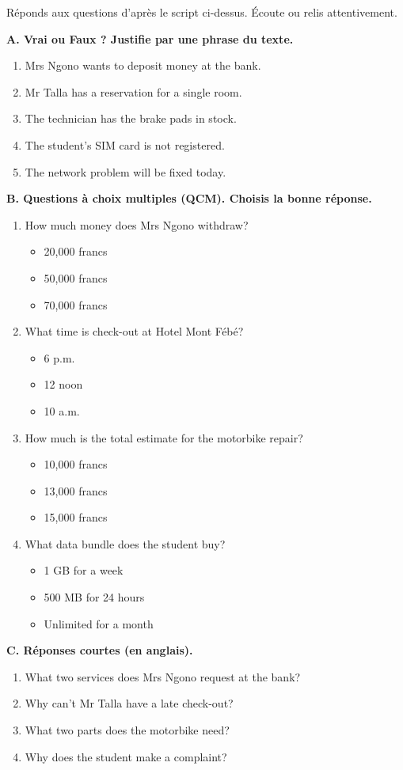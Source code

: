 \documentclass[11pt]{article}
\begin{document}
\begin{exercice}
Réponds aux questions d'après le script ci-dessus. Écoute ou relis attentivement.

\textbf{A. Vrai ou Faux ? Justifie par une phrase du texte.}
\begin{enumerate}
\item Mrs Ngono wants to deposit money at the bank.
\item Mr Talla has a reservation for a single room.
\item The technician has the brake pads in stock.
\item The student's SIM card is not registered.
\item The network problem will be fixed today.
\end{enumerate}

\textbf{B. Questions à choix multiples (QCM). Choisis la bonne réponse.}
\begin{enumerate}
\item How much money does Mrs Ngono withdraw?
\begin{itemize}
\item[a)] 20,000 francs
\item[b)] 50,000 francs
\item[c)] 70,000 francs
\end{itemize}
\item What time is check-out at Hotel Mont Fébé?
\begin{itemize}
\item[a)] 6 p.m.
\item[b)] 12 noon
\item[c)] 10 a.m.
\end{itemize}
\item How much is the total estimate for the motorbike repair?
\begin{itemize}
\item[a)] 10,000 francs
\item[b)] 13,000 francs
\item[c)] 15,000 francs
\end{itemize}
\item What data bundle does the student buy?
\begin{itemize}
\item[a)] 1 GB for a week
\item[b)] 500 MB for 24 hours
\item[c)] Unlimited for a month
\end{itemize}
\end{enumerate}

\textbf{C. Réponses courtes (en anglais).}
\begin{enumerate}
\item What two services does Mrs Ngono request at the bank?
\item Why can't Mr Talla have a late check-out?
\item What two parts does the motorbike need?
\item Why does the student make a complaint?
\end{enumerate}
\end{exercice}
\end{document}
